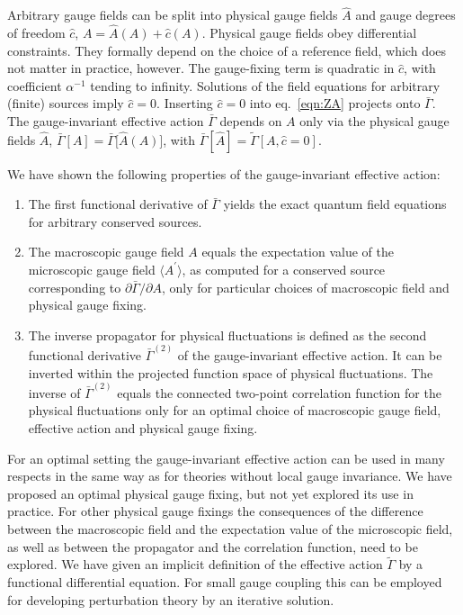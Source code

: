 \documentclass[twocolumn,aps,prd,amsmath,amssymb,preprintnumbers,longbibliography]{revtex4-1}
\numberwithin{equation}{section}
\begin{document}
Arbitrary gauge fields can be split into physical gauge fields $\hat{A}$ and gauge degrees of freedom $\hat{c}$, $A = \hat{A}(A) + \hat{c}(A)$. Physical gauge fields obey differential constraints. They formally depend on the choice of a reference field, which does not matter in practice, however. The gauge-fixing term is quadratic in $\hat{c}$, with coefficient $\alpha^{-1}$ tending to infinity. Solutions of the field equations for arbitrary (finite) sources imply $\hat{c} = 0$. Inserting $\hat{c} = 0$ into eq.~\eqref{eqn:ZA} projects onto $\bar\Gamma$. The gauge-invariant effective action $\bar\Gamma$ depends on $A$ only via the physical gauge fields $\hat{A}$, $\bar\Gamma[A] = \bar\Gamma\bigl[\hat{A}(A)]$, with $\bar\Gamma[\hat{A}] = \tilde\Gamma[A,\hat{c} = 0]$.

We have shown the following properties of the gauge-invariant effective action:
\begin{enumerate}[label=(\roman*)]
	\item The first functional derivative of $\bar\Gamma$ yields the exact quantum field equations for arbitrary conserved sources.
	\item The macroscopic gauge field $A$ equals the expectation value of the microscopic gauge field $\langle A^\prime\rangle$, as computed for a conserved source corresponding to $\partial \bar\Gamma/\partial A$, only for particular choices of macroscopic field and physical gauge fixing.
	\item The inverse propagator for physical fluctuations is defined as the second functional derivative $\bar\Gamma^{(2)}$ of the gauge-invariant effective action. It can be inverted within the projected function space of physical fluctuations. The inverse of $\bar\Gamma^{(2)}$ equals the connected two-point correlation function for the physical fluctuations only for an optimal choice of macroscopic gauge field, effective action and physical gauge fixing.
\end{enumerate}

For an optimal setting the gauge-invariant effective action can be used in many respects in the same way as for theories without local gauge invariance. We have proposed an optimal physical gauge fixing, but not yet explored its use in practice. For other physical gauge fixings the consequences of the difference between the macroscopic field and the expectation value of the microscopic field, as well as between the propagator and the correlation function, need to be explored. We have given an implicit definition of the effective action $\tilde\Gamma$ by a functional differential equation. For small gauge coupling this can be employed for developing perturbation theory by an iterative solution.
\end{document}
